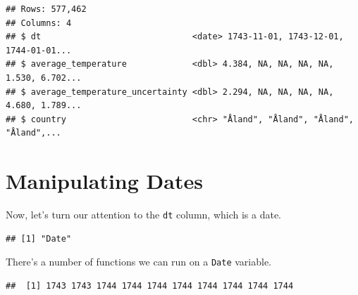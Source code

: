 \documentclass[
]{book}
\newenvironment{Shaded}{\begin{snugshade}}{\end{snugshade}}
\newcommand{\CommentTok}[1]{\textcolor[rgb]{0.56,0.35,0.01}{\textit{#1}}}
\newcommand{\DecValTok}[1]{\textcolor[rgb]{0.00,0.00,0.81}{#1}}
\newcommand{\KeywordTok}[1]{\textcolor[rgb]{0.13,0.29,0.53}{\textbf{#1}}}
\newcommand{\NormalTok}[1]{#1}
\newcommand{\OperatorTok}[1]{\textcolor[rgb]{0.81,0.36,0.00}{\textbf{#1}}}
\newcommand{\StringTok}[1]{\textcolor[rgb]{0.31,0.60,0.02}{#1}}
\begin{document}
\begin{Shaded}
\end{Shaded}

\begin{verbatim}
## Rows: 577,462
## Columns: 4
## $ dt                              <date> 1743-11-01, 1743-12-01, 1744-01-01...
## $ average_temperature             <dbl> 4.384, NA, NA, NA, NA, 1.530, 6.702...
## $ average_temperature_uncertainty <dbl> 2.294, NA, NA, NA, NA, 4.680, 1.789...
## $ country                         <chr> "Åland", "Åland", "Åland", "Åland",...
\end{verbatim}

\hypertarget{manipulating-dates}{%
\section{Manipulating Dates}\label{manipulating-dates}}

Now, let's turn our attention to the \texttt{dt} column, which is a date.

\begin{Shaded}
\end{Shaded}

\begin{verbatim}
## [1] "Date"
\end{verbatim}

There's a number of functions we can run on a \texttt{Date} variable.

\begin{Shaded}
\end{Shaded}

\begin{verbatim}
##  [1] 1743 1743 1744 1744 1744 1744 1744 1744 1744 1744
\end{verbatim}
\end{document}
